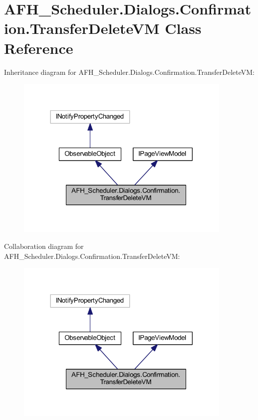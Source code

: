 \section{A\+F\+H\+\_\+\+Scheduler.\+Dialogs.\+Confirmation.\+Transfer\+Delete\+VM Class Reference}
\label{class_a_f_h___scheduler_1_1_dialogs_1_1_confirmation_1_1_transfer_delete_v_m}


Inheritance diagram for A\+F\+H\+\_\+\+Scheduler.\+Dialogs.\+Confirmation.\+Transfer\+Delete\+VM\+:
\nopagebreak
\begin{figure}[H]
\begin{center}
\leavevmode
\includegraphics[width=293pt]{class_a_f_h___scheduler_1_1_dialogs_1_1_confirmation_1_1_transfer_delete_v_m__inherit__graph}
\end{center}
\end{figure}


Collaboration diagram for A\+F\+H\+\_\+\+Scheduler.\+Dialogs.\+Confirmation.\+Transfer\+Delete\+VM\+:
\nopagebreak
\begin{figure}[H]
\begin{center}
\leavevmode
\includegraphics[width=293pt]{class_a_f_h___scheduler_1_1_dialogs_1_1_confirmation_1_1_transfer_delete_v_m__coll__graph}
\end{center}
\end{figure}

